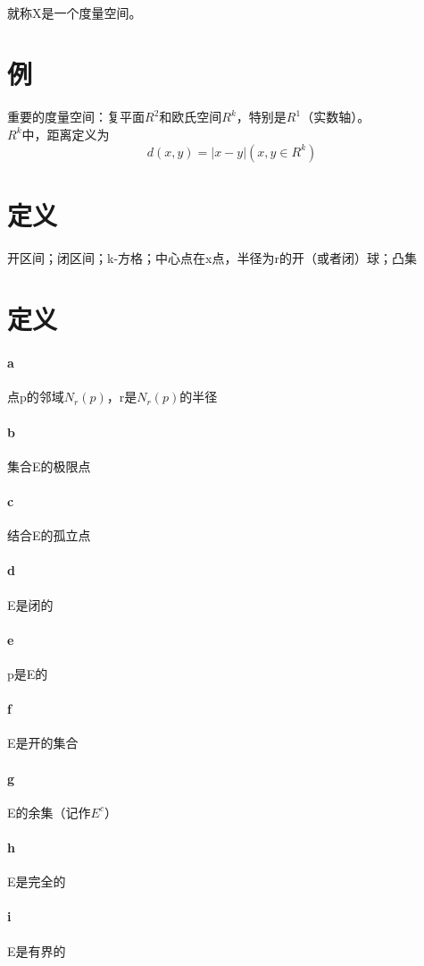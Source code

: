 \paragraph*{} 就称X是一个度量空间。
\section{例} 重要的度量空间：复平面$R^2$和欧氏空间$R^k$，特别是$R^1$（实数轴）。\\$R^k$中，距离定义为$$ d(x,y) = \vert x - y \vert  (x, y \in R ^k) $$
\section{定义} 开区间；闭区间；k-方格；中心点在x点，半径为r的开（或者闭）球；凸集
\section{定义}
\paragraph{a} 点p的邻域$N_r(p)$，r是$N_r(p)$的半径
\paragraph{b} 集合E的极限点
\paragraph{c} 结合E的孤立点
\paragraph{d} E是闭的
\paragraph{e} p是E的
\paragraph{f} E是开的集合
\paragraph{g} E的余集（记作$E^c$）
\paragraph{h} E是完全的
\paragraph{i} E是有界的
